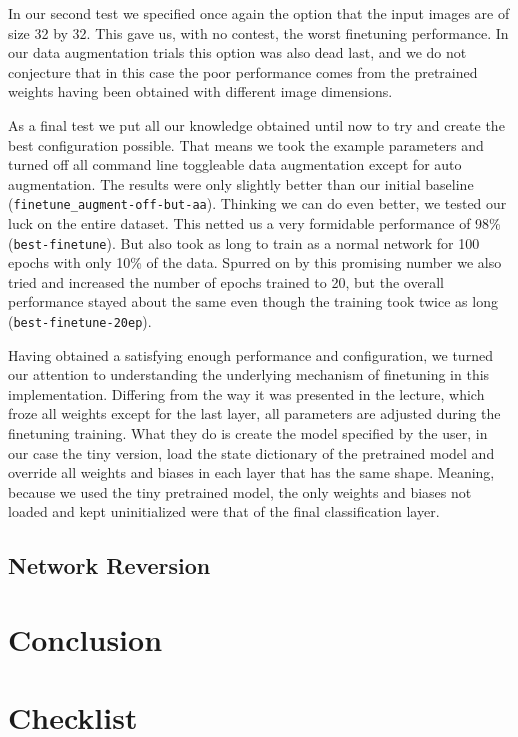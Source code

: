 \documentclass{article}
\begin{document}
    In our second test we specified once again the option that the input images are of size 32 by 32.
    This gave us, with no contest, the worst finetuning performance.
    In our data augmentation trials this option was also dead last, and we do not conjecture that in this case the poor performance comes from the pretrained weights having been obtained with different image dimensions.

    As a final test we put all our knowledge obtained until now to try and create the best configuration possible.
    That means we took the example parameters and turned off all command line toggleable data augmentation except for auto augmentation.
    The results were only slightly better than our initial baseline (\texttt{finetune\_augment-off-but-aa}).
    Thinking we can do even better, we tested our luck on the entire dataset.
    This netted us a very formidable performance of 98\% (\texttt{best-finetune}).
    But also took as long to train as a normal network for 100 epochs with only 10\% of the data.
    Spurred on by this promising number we also tried and increased the number of epochs trained to 20, but the overall performance stayed about the same even though the training took twice as long (\texttt{best-finetune-20ep}).

    Having obtained a satisfying enough performance and configuration, we turned our attention to understanding the underlying mechanism of finetuning in this implementation.
    Differing from the way it was presented in the lecture, which froze all weights except for the last layer, all parameters are adjusted during the finetuning training.
    What they do is create the model specified by the user, in our case the tiny version, load the state dictionary of the pretrained model and override all weights and biases in each layer that has the same shape.
    Meaning, because we used the tiny pretrained model, the only weights and biases not loaded and kept uninitialized were that of the final classification layer.


    \subsection{Network Reversion}\label{subsec:network-reversion}


    \section{Conclusion}\label{sec:conclusion}

    \printbibliography
    \section*{Checklist}
    
\end{document}
